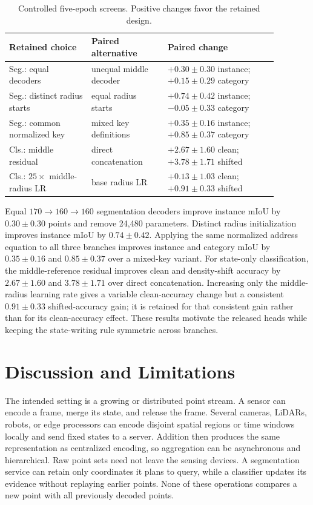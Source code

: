 \documentclass[11pt,a4paper]{article}
\begin{document}
\begin{table}[t]
\centering
\caption{Controlled five-epoch screens. Positive changes favor the retained design.}
\label{tab:screens}
\small
\begin{tabular}{p{0.27\linewidth}p{0.25\linewidth}p{0.36\linewidth}}
\toprule
Retained choice & Paired alternative & Paired change\\
\midrule
Seg.: equal decoders & unequal middle decoder & $+0.30\pm0.30$ instance; $+0.15\pm0.29$ category\\
Seg.: distinct radius starts & equal radius starts & $+0.74\pm0.42$ instance; $-0.05\pm0.33$ category\\
Seg.: common normalized key & mixed key definitions & $+0.35\pm0.16$ instance; $+0.85\pm0.37$ category\\
Cls.: middle residual & direct concatenation & $+2.67\pm1.60$ clean; $+3.78\pm1.71$ shifted\\
Cls.: $25\times$ middle-radius LR & base radius LR & $+0.13\pm1.03$ clean; $+0.91\pm0.33$ shifted\\
\bottomrule
\end{tabular}
\end{table}

Equal $170\rightarrow160\rightarrow160$ segmentation decoders improve instance mIoU by $0.30\pm0.30$ points and remove 24,480 parameters. Distinct radius initialization improves instance mIoU by $0.74\pm0.42$. Applying the same normalized address equation to all three branches improves instance and category mIoU by $0.35\pm0.16$ and $0.85\pm0.37$ over a mixed-key variant. For state-only classification, the middle-reference residual improves clean and density-shift accuracy by $2.67\pm1.60$ and $3.78\pm1.71$ over direct concatenation. Increasing only the middle-radius learning rate gives a variable clean-accuracy change but a consistent $0.91\pm0.33$ shifted-accuracy gain; it is retained for that consistent gain rather than for its clean-accuracy effect. These results motivate the released heads while keeping the state-writing rule symmetric across branches.

\section{Discussion and Limitations}
The intended setting is a growing or distributed point stream. A sensor can encode a frame, merge its state, and release the frame. Several cameras, LiDARs, robots, or edge processors can encode disjoint spatial regions or time windows locally and send fixed states to a server. Addition then produces the same representation as centralized encoding, so aggregation can be asynchronous and hierarchical. Raw point sets need not leave the sensing devices. A segmentation service can retain only coordinates it plans to query, while a classifier updates its evidence without replaying earlier points. None of these operations compares a new point with all previously decoded points.
\end{document}
